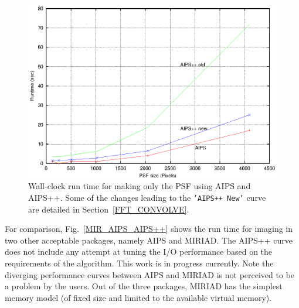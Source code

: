 \begin{figure}[t!]
\begin{center}
  \includegraphics[scale=0.9]{psfonly.time.eps}
\caption[AIPS and AIPS++ time for making PSF only]{\small Wall-clock run time for
making only the PSF using AIPS and AIPS++.  Some of the changes
leading to the {\tt 'AIPS++ New'} curve are detailed in
Section~\ref{FFT_CONVOLVE}.}
\label{PSFPlot}
\end{center}
\end{figure}

For comparison, Fig.~\ref{MIR_AIPS_AIPS++} shows the run time for
imaging in two other acceptable packages, namely AIPS and MIRIAD.  The
AIPS++ curve does not include any attempt at tuning the I/O
performance based on the requirements of the algorithm.  This work is
in progress currently.  Note the diverging performance curves between
AIPS and MIRIAD is not perceived to be a problem by the users.  Out of
the three packages, MIRIAD has the simplest memory model (of fixed
size and limited to the available virtual memory).


